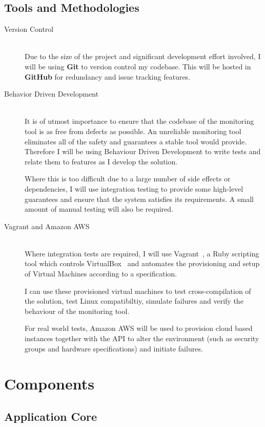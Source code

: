 \documentclass{cshonours}
\begin{document}
\subsection{Tools and Methodologies}
\begin{description}
  \item [Version Control]\hfill \\
    Due to the size of the project and significant development effort involved, I will be using \textbf{Git} to version control my codebase. This will be hosted in \textbf{GitHub} for redundancy and issue tracking features.
  \item [Behavior Driven Development]\hfill \\
    It is of utmost importance to ensure that the codebase of the monitoring tool is as free from defects as possible. An unreliable monitoring tool eliminates all of the safety and guarantees a stable tool would provide. Therefore I will be using Behaviour Driven Development to write tests and relate them to features as I develop the solution.

    Where this is too difficult due to a large number of side effects or dependencies, I will use integration testing to provide some high-level guarantees and ensure that the system satisfies its requirements. A small amount of manual testing will also be required.
  \item [Vagrant and Amazon AWS]\hfill \\
    Where integration tests are required, I will use Vagrant~\cite{Vagrant}, a Ruby scripting tool which controls VirtualBox~\cite{VirtualBox} and automates the provisioning and setup of Virtual Machines according to a specification.

    I can use these provisioned virtual machines to test cross-compilation of the solution, test Linux compatibiltiy, simulate failures and verify the behaviour of the monitoring tool.
   
    For real world tests, Amazon AWS will be used to provision cloud based instances together with the API to alter the environment (such as security groups and hardware specifications) and initiate failures. 
\end{description}

\section{Components}
\subsection{Application Core}
\end{document}

